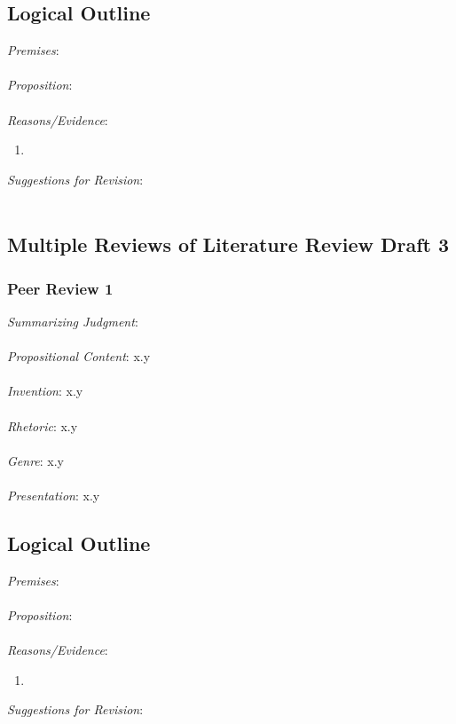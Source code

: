 \documentclass[12pt]{article}
\begin{document}
\subsection*{Logical Outline}
\noindent \textit{Premises}: \\ \\
\textit{Proposition}: \\ \\
\textit{Reasons/Evidence}:
\begin{enumerate}
	\item \ %
\end{enumerate}
\textit{Suggestions for Revision}: \\\\

\newpage
\subsection{Multiple Reviews of Literature Review Draft 3}
\subsubsection*{Peer Review 1} 
\noindent \textit{Summarizing Judgment}: \\ \\
\textit{Propositional Content}: x.y \\ \\ %
\textit{Invention}: x.y \\ \\
\textit{Rhetoric}: x.y \\ \\
\textit{Genre}: x.y \\ \\
\textit{Presentation}: x.y
\subsection*{Logical Outline}
\noindent \textit{Premises}: \\ \\
\textit{Proposition}: \\ \\
\textit{Reasons/Evidence}:
\begin{enumerate}
	\item \ %
\end{enumerate}
\textit{Suggestions for Revision}: \\\\
\end{document}
